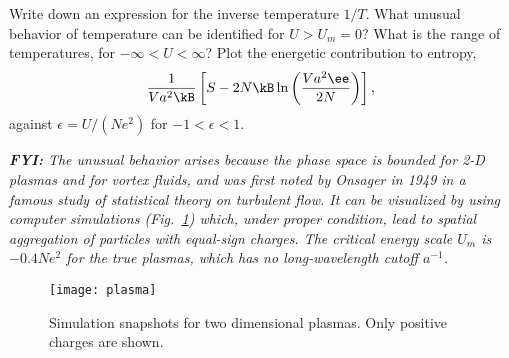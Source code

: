 \smallskip\subp
Write down an expression for the inverse temperature $1/T$.
What unusual behavior of temperature can be identified for $U > U_m = 0$?
What is the range of temperatures, for $-\infty < U < \infty$?
Plot the energetic contribution to entropy,
$$ \frac{1}{Va^2 \kB} \left[S - 2N\kB \ln\left(\frac{Va^2\ee}{2N}\right)\right], $$
against $\epsilon=U/(Ne^2)$ for $-1 < \epsilon < 1$.
\hfil\break
\strut\hfil\break
{\sl {\bf FYI:} The unusual behavior arises because the phase space is
bounded for 2-D plasmas and for vortex fluids,
and was first noted by Onsager in 1949
in a famous study of statistical theory on turbulent flow.
It can be visualized by using computer simulations (Fig.~\ref{fig:plasma}) which,
under proper condition, lead to spatial aggregation of particles with equal-sign charges.
The critical energy scale $U_m$ is $-0.4 Ne^2$ for the true plasmas,
which has no long-wavelength cutoff $a^{-1}$.
}

\begin{figure}[h]\centering
\texttt{[image: plasma]}
\caption{
Simulation snapshots for two dimensional plasmas.
Only positive charges are shown.
\label{fig:plasma}}
\end{figure}

